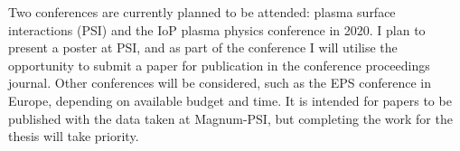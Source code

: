 \documentclass[a4paper, 12pt]{article} %
\begin{document}
	Two conferences are currently planned to be attended: plasma surface interactions (PSI) and the IoP plasma physics conference in 2020.
	I plan to present a poster at PSI, and as part of the conference I will utilise the opportunity to submit a paper for publication in the conference proceedings journal.
	Other conferences will be considered, such as the EPS conference in Europe, depending on available budget and time.
	It is intended for papers to be published with the data taken at Magnum-PSI, but completing the work for the thesis will take priority. 




\begingroup
{}
\setlength\bibitemsep{3.5pt}
\printbibliography
\endgroup
%
%

\end{document}
